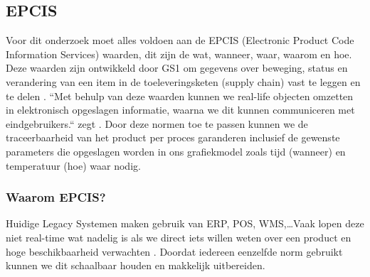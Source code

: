 \subsection{EPCIS}
Voor dit onderzoek moet alles voldoen aan de EPCIS (Electronic Product Code Information Services) waarden, dit zijn de wat, wanneer, waar, waarom en hoe. 
Deze waarden zijn ontwikkeld door GS1 om gegevens over beweging, status en verandering van een item in de toeleveringsketen (supply chain) vast te leggen en te delen \autocite{Devins}.
``Met behulp van deze waarden kunnen we real-life objecten omzetten in elektronisch opgeslagen informatie, waarna we dit kunnen communiceren met eindgebruikers.`` zegt \textcite{Devins}.
Door deze normen toe te passen kunnen we de traceerbaarheid van het product per proces garanderen inclusief de gewenste parameters die opgeslagen worden in ons grafiekmodel zoals tijd (wanneer) en temperatuur (hoe) waar nodig.
\subsubsection{Waarom EPCIS?}
Huidige Legacy Systemen maken gebruik van ERP, POS, WMS,\dots Vaak lopen deze niet real-time wat nadelig is als we direct iets willen weten over een product en hoge beschikbaarheid verwachten \autocite{Vieweger}.
Doordat iedereen eenzelfde norm gebruikt kunnen we dit schaalbaar houden en makkelijk uitbereiden.








